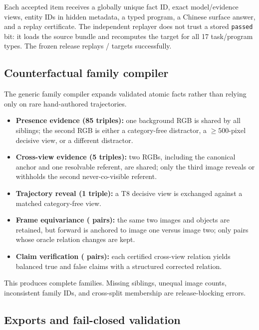 Each accepted item receives a globally unique fact ID, exact model/evidence
views, entity IDs in hidden metadata, a typed program, a Chinese surface
answer, and a replay certificate.  The independent replayer does not trust a
stored \texttt{passed} bit: it loads the source bundle and recomputes the target
for all 17 task/program types.  The frozen release replays
\EpiReplayedCertificates{}/\EpiReplayedCertificates{} targets successfully.

\subsection{Counterfactual family compiler}

The generic family compiler expands validated atomic facts rather than relying
only on rare hand-authored trajectories.
\begin{itemize}
  \item \textbf{Presence evidence (85 triples):} one background RGB is shared
        by all siblings; the second RGB is either a category-free distractor,
        a $\geq500$-pixel decisive view, or a different distractor.
  \item \textbf{Cross-view evidence (5 triples):} two RGBs, including the
        canonical anchor and one resolvable referent, are shared; only the
        third image reveals or withholds the second never-co-visible referent.
  \item \textbf{Trajectory reveal (1 triple):} a T8 decisive view is exchanged
        against a matched category-free view.
  \item \textbf{Frame equivariance (\EpiFrameFamilies{} pairs):} the same two
        images and objects are retained, but forward is anchored to image one
        versus image two; only pairs whose oracle relation changes are kept.
  \item \textbf{Claim verification (\EpiClaimFamilies{} pairs):} each certified
        cross-view relation yields balanced true and false claims with a
        structured corrected relation.
\end{itemize}
This produces \EpiConsistencyFamilies{} complete families.  Missing siblings,
unequal image counts, inconsistent family IDs, and cross-split membership are
release-blocking errors.

\subsection{Exports and fail-closed validation}

